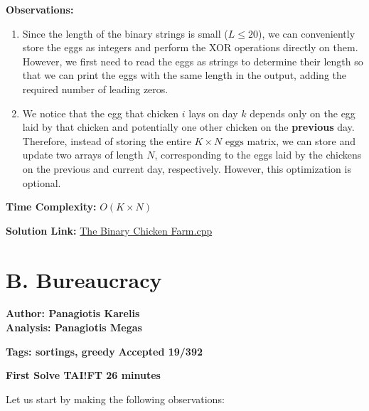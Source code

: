 \documentclass{article}
\begin{document}
\textbf{Observations:}
\begin{enumerate}
    \item Since the length of the binary strings is small (\(L \leq 20\)), we can conveniently store the eggs as integers and perform the XOR operations directly on them. However, we first need to read the eggs as strings to determine their length so that we can print the eggs with the same length in the output, adding the required number of leading zeros. 
    \item We notice that the egg that chicken \(i\) lays on day \(k\) depends only on the egg laid by that chicken and potentially one other chicken on the \textbf{previous} day. Therefore, instead of storing the entire \(K \times N\) \(\text{eggs}\) matrix, we can store and update two arrays of length \(N\), corresponding to the eggs laid by the chickens on the previous and current day, respectively. However, this optimization is optional.

\end{enumerate}

\vspace{1em}

\textbf{Time Complexity:}
$O(K \times N)$

\vspace{1em}
\noindent \textbf{Solution Link:} 
\href{https://github.com/StathisKons/GRCPC-2024-Editorial-Implementations/blob/main/Sample%20Implementations/A.%20The%20Binary%20Chicken%20Farm.cpp}{The Binary Chicken Farm.cpp}


\vspace{5em}

\newpage 

\section*{B. Bureaucracy}

\textbf{Author: Panagiotis Karelis} \\
\textbf{Analysis: Panagiotis Megas}

\vspace{2em}

\noindent
\textbf{Tags: sortings, greedy} \hfill \textbf{Accepted 19/392}

\hfill \textbf{First Solve TAI!FT 26 minutes}

\vspace{2em}

\noindent Let us start by making the following observations:
\end{document}
